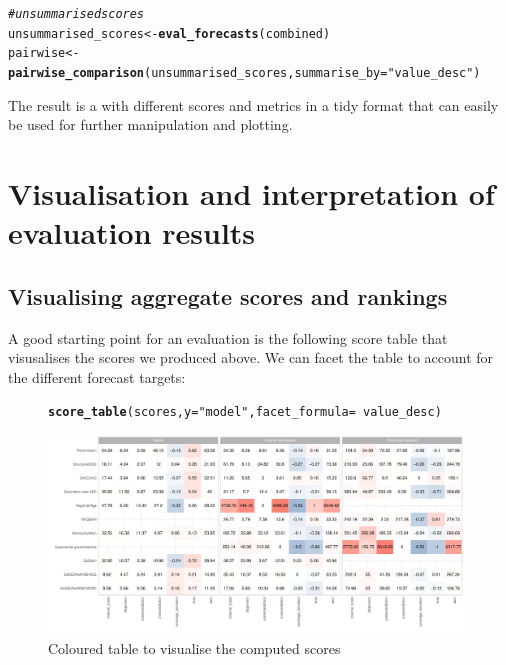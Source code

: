 \documentclass[article,shortnames]{jss}\usepackage[]{graphicx}\usepackage[]{color}
\makeatletter
\newcommand{\hlstr}[1]{\textcolor[rgb]{0.192,0.494,0.8}{#1}}%
\newcommand{\hlcom}[1]{\textcolor[rgb]{0.678,0.584,0.686}{\textit{#1}}}%
\newcommand{\hlopt}[1]{\textcolor[rgb]{0,0,0}{#1}}%
\newcommand{\hlstd}[1]{\textcolor[rgb]{0.345,0.345,0.345}{#1}}%
\newcommand{\hlkwb}[1]{\textcolor[rgb]{0.69,0.353,0.396}{#1}}%
\newcommand{\hlkwc}[1]{\textcolor[rgb]{0.333,0.667,0.333}{#1}}%
\newcommand{\hlkwd}[1]{\textcolor[rgb]{0.737,0.353,0.396}{\textbf{#1}}}%
\newenvironment{kframe}{%
 \def\at@end@of@kframe{}%
 \ifinner\ifhmode%
  \def\at@end@of@kframe{\end{minipage}}%
  \begin{minipage}{\columnwidth}%
 \fi\fi%
 \def\FrameCommand##1{\hskip\@totalleftmargin \hskip-\fboxsep
 \colorbox{shadecolor}{##1}\hskip-\fboxsep
     \hskip-\linewidth \hskip-\@totalleftmargin \hskip\columnwidth}%
 \MakeFramed {\advance\hsize-\width
   \@totalleftmargin\z@ \linewidth\hsize
   \@setminipage}}%
 {\par\unskip\endMakeFramed%
 \at@end@of@kframe}
\newenvironment{knitrout}{}{} %
\makeatother
\begin{document}
\begin{knitrout}
\color{fgcolor}\begin{kframe}
\begin{alltt}
\hlcom{# unsummarised scores}
\hlstd{unsummarised_scores} \hlkwb{<-} \hlkwd{eval_forecasts}\hlstd{(combined)}
\hlstd{pairwise} \hlkwb{<-} \hlkwd{pairwise_comparison}\hlstd{(unsummarised_scores,} \hlkwc{summarise_by} \hlstd{=} \hlstr{"value_desc"}\hlstd{)}
\end{alltt}
\end{kframe}
\end{knitrout}

The result is a  with different scores and metrics in a tidy format that can easily be used for further manipulation and plotting. 

\section{Visualisation and interpretation of evaluation results}

\subsection{Visualising aggregate scores and rankings}
A good starting point for an evaluation is the following score table that visusalises the scores we produced above. We can facet the table to account for the different forecast targets: 

\begin{figure}[h]
\centering
\begin{knitrout}
\color{fgcolor}\begin{kframe}
\begin{alltt}
\hlkwd{score_table}\hlstd{(scores,} \hlkwc{y} \hlstd{=} \hlstr{"model"}\hlstd{,} \hlkwc{facet_formula} \hlstd{=} \hlopt{~}\hlstd{value_desc)}
\end{alltt}
\end{kframe}
\includegraphics[width=0.98\textwidth]{plots/plot-score-table-1} 
\end{knitrout}
\caption{\label{fig:score-table} Coloured table to visualise the computed scores}
\end{figure}
\end{document}
